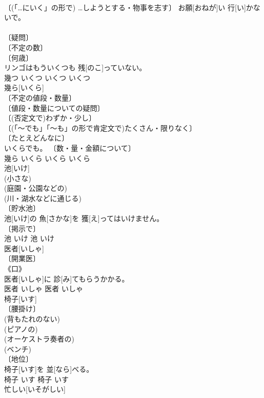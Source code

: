 \documentclass[8pt]{extreport}
\begin{document}
\begin{CJK}{UTF8}{min}
\\	〔(「…にいく」の形で) …しようとする・物事を志す〕	お願[おねが]い 行[い]かないで。	
\\	[《文》 
\\	行く	いく	行く	いく	
\\	幾つ[いくつ]	
\\	〔疑問〕 
\\	〔不定の数〕 
\\	〔何歳〕 
\\	リンゴはもういくつも 残[のこ]っていない。	
\\	幾つ	いくつ	いくつ	いくつ	
\\	幾ら[いくら]	
\\	〔不定の値段・数量〕 
\\	〔値段・数量についての疑問〕 
\\	〔(否定文で)わずか・少し〕 
\\	〔(「～でも」「～も」の形で肯定文で)たくさん・限りなく〕 
\\	〔たとえどんなに〕 
\\	いくらでも。	〔数・量・金額について〕 
\\	幾ら	いくら	いくら	いくら	
\\	池[いけ]	
\\	(小さな) 
\\	(庭園・公園などの) 
\\	(川・湖水などに通じる) 
\\	〔貯水池〕 
\\	池[いけ]の 魚[さかな]を 獲[え]ってはいけません。	
\\	〔掲示で〕 
\\	池	いけ	池	いけ	
\\	医者[いしゃ]	
\\	〔開業医〕 
\\	《口》 
\\	医者[いしゃ]に 診[み]てもらう{かかる}。	
\\	医者	いしゃ	医者	いしゃ	
\\	椅子[いす]	
\\	〔腰掛け〕 
\\	(背もたれのない) 
\\	(ピアノの) 
\\	(オーケストラ奏者の) 
\\	(ベンチ) 
\\	〔地位〕 
\\	[＝ちい２]	椅子[いす]を 並[なら]べる。	
\\	椅子	いす	椅子	いす	
\\	忙しい[いそがしい]	

\end{CJK}
\end{document}
